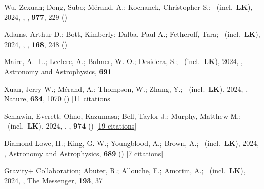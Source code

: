 \item[{\color{numcolor}\scriptsize127}] Wu, Zexuan; Dong, Subo; M{\'e}rand, A.; Kochanek, Christopher S.; \etal\ (incl.\ \textbf{LK}), 2024, , \apj, \textbf{977}, 229 ()

\item[{\color{numcolor}\scriptsize126}] Adams, Arthur D.; Bott, Kimberly; Dalba, Paul A.; Fetherolf, Tara; \etal\ (incl.\ \textbf{LK}), 2024, , \aj, \textbf{168}, 248 ()

\item[{\color{numcolor}\scriptsize125}] Maire, A. -L.; Leclerc, A.; Balmer, W. O.; Desidera, S.; \etal\ (incl.\ \textbf{LK}), 2024, , Astronomy and Astrophysics, \textbf{691}

\item[{\color{numcolor}\scriptsize124}] Xuan, Jerry W.; M{\'e}rand, A.; Thompson, W.; Zhang, Y.; \etal\ (incl.\ \textbf{LK}), 2024, , Nature, \textbf{634}, 1070 () [\href{https://ui.adsabs.harvard.edu/abs/2024Natur.634.1070X}{11 citations}]

\item[{\color{numcolor}\scriptsize123}] Schlawin, Everett; Ohno, Kazumasa; Bell, Taylor J.; Murphy, Matthew M.; \etal\ (incl.\ \textbf{LK}), 2024, , \apj, \textbf{974} () [\href{https://ui.adsabs.harvard.edu/abs/2024ApJ...974L..33S}{19 citations}]

\item[{\color{numcolor}\scriptsize122}] Diamond-Lowe, H.; King, G. W.; Youngblood, A.; Brown, A.; \etal\ (incl.\ \textbf{LK}), 2024, , Astronomy and Astrophysics, \textbf{689} () [\href{https://ui.adsabs.harvard.edu/abs/2024A&A...689A..48D}{7 citations}]

\item[{\color{numcolor}\scriptsize121}] Gravity+ Collaboration; Abuter, R.; Allouche, F.; Amorim, A.; \etal\ (incl.\ \textbf{LK}), 2024, , The Messenger, \textbf{193}, 37

